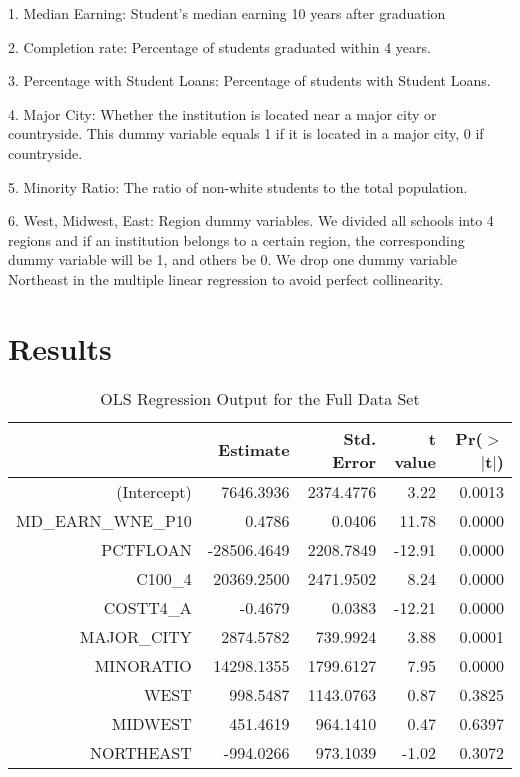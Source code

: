 \documentclass{article}
\begin{document}
1. Median Earning: Student's median earning 10 years after graduation

2. Completion rate: Percentage of students graduated within 4 years.

3. Percentage with Student Loans: Percentage of students with Student Loans.

4. Major City: Whether the institution is located near a major city or countryside. This dummy variable equals 1 if it is located in a major city, 0 if countryside.

5. Minority Ratio: The ratio of non-white students to the total population.

6. West, Midwest, East: Region dummy variables. We divided all schools into 4 regions and if an institution belongs to a certain region, the corresponding dummy variable will be 1, and others be 0. We drop one dummy variable Northeast in the multiple linear regression to avoid perfect collinearity.

\section{Results}

\begin{Schunk}
\begin{Soutput}
\begin{table}[H]
\centering
\begin{tabular}{rrrrr}
  \hline
 & Estimate & Std. Error & t value & Pr($>$$|$t$|$) \\ 
  \hline
(Intercept) & 7646.3936 & 2374.4776 & 3.22 & 0.0013 \\ 
  MD\_EARN\_WNE\_P10 & 0.4786 & 0.0406 & 11.78 & 0.0000 \\ 
  PCTFLOAN & -28506.4649 & 2208.7849 & -12.91 & 0.0000 \\ 
  C100\_4 & 20369.2500 & 2471.9502 & 8.24 & 0.0000 \\ 
  COSTT4\_A & -0.4679 & 0.0383 & -12.21 & 0.0000 \\ 
  MAJOR\_CITY & 2874.5782 & 739.9924 & 3.88 & 0.0001 \\ 
  MINORATIO & 14298.1355 & 1799.6127 & 7.95 & 0.0000 \\ 
  WEST & 998.5487 & 1143.0763 & 0.87 & 0.3825 \\ 
  MIDWEST & 451.4619 & 964.1410 & 0.47 & 0.6397 \\ 
  NORTHEAST & -994.0266 & 973.1039 & -1.02 & 0.3072 \\ 
   \hline
\end{tabular}
\caption{OLS Regression Output for the Full Data Set} 
\end{table}
\end{Soutput}
\end{Schunk}
  
\end{document}
